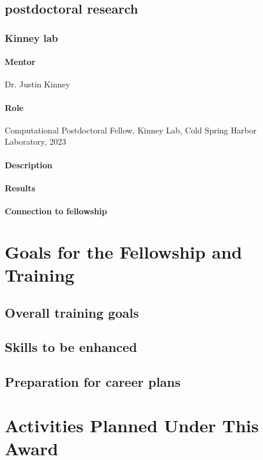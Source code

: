 \documentclass[11pt]{article}
\begin{document}
\subsection{postdoctoral research}
\subsubsection{Kinney lab}
%
\paragraph{Mentor}
Dr. Justin Kinney
%
\paragraph{Role}
Computational Postdoctoral Fellow, Kinney Lab, Cold Spring Harbor Laboratory, 2023
%
\paragraph{Description}
%
\paragraph{Results}
%
\paragraph{Connection to fellowship}
%
\section*{Goals for the Fellowship and Training}
%
\subsection{Overall training goals}
%
\subsection{Skills to be enhanced}
%
\subsection{Preparation for career plans}
%
\section*{Activities Planned Under This Award}
\end{document}
